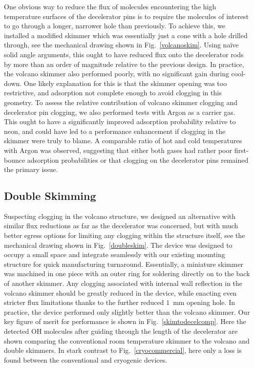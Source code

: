 One obvious way to reduce the flux of molecules encountering the high temperature surfaces of the decelerator pins is to require the molecules of interest to go through a longer, narrower hole than previously.
To achieve this, we installed a modified skimmer which was essentially just a cone with a hole drilled through, see the mechanical drawing shown in Fig.~\ref{volcanoskim}.
Using na\"{i}ve solid angle arguments, this ought to have reduced flux onto the decelerator rods by more than an order of magnitude relative to the previous design.
In practice, the volcano skimmer also performed poorly, with no significant gain during cool-down.
One likely explanation for this is that the skimmer opening was too restrictive, and adsorption not complete enough to avoid clogging in this geometry.
To assess the relative contribution of volcano skimmer clogging and decelerator pin clogging, we also performed tests with Argon as a carrier gas.
This ought to have a significantly improved adsorption probability relative to neon, and could have led to a performance enhancement if clogging in the skimmer were truly to blame.
A comparable ratio of hot and cold temperatures with Argon was observed, suggesting that either both gases had rather poor first-bounce adsorption probabilities or that clogging on the decelerator pins remained the primary issue.

\subsection{Double Skimming}


Suspecting clogging in the volcano structure, we designed an alternative with similar flux reductions as far as the decelerator was concerned, but with much better egress options for limiting any clogging within the structure itself, see the mechanical drawing shown in Fig.~\ref{doubleskim}.
The device was designed to occupy a small space and integrate seamlessly with our existing mounting structure for quick manufacturing turnaround.
Essentially, a miniature skimmer was machined in one piece with an outer ring for soldering directly on to the back of another skimmer.
Any clogging associated with internal wall reflection in the volcano skimmer should be greatly reduced in the device, while enacting even stricter flux limitations thanks to the further reduced $1$~mm opening hole.
In practice, the device performed only slightly better than the volcano skimmer.
Our key figure of merit for performance is shown in Fig.~\ref{skimtodecelcomp}.
Here the detected OH molecules after guiding through the length of the decelerator are shown comparing the conventional room temperature skimmer to the volcano and double skimmers.
In stark contrast to Fig.~\ref{cryocommercial}, here only a loss is found between the conventional and cryogenic devices.

